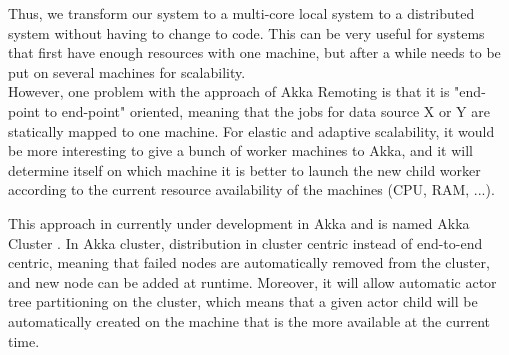 Thus, we transform our system to a multi-core local system to a distributed system without having to change to code. This can be very useful for systems that first have enough
resources with one machine, but after a while needs to be put on several machines for scalability.
\\

However, one problem with the approach of Akka Remoting is that it is "end-point to end-point" oriented, meaning that the jobs for data source X or Y are statically
mapped to one machine. For elastic and adaptive scalability, it would be more interesting to give a bunch of worker machines to Akka, and it will determine itself on which machine 
it is better to launch the new child worker according to the current resource availability of the machines (CPU, RAM, ...).

This approach in currently under development in Akka and is named Akka Cluster . In Akka cluster, distribution in cluster centric instead of end-to-end centric, meaning that failed nodes are automatically removed from the cluster, and new node can be added at runtime. Moreover, it will allow automatic actor tree partitioning on the cluster, which means that a given actor child will be automatically created on the machine that is the more available at the current time.

